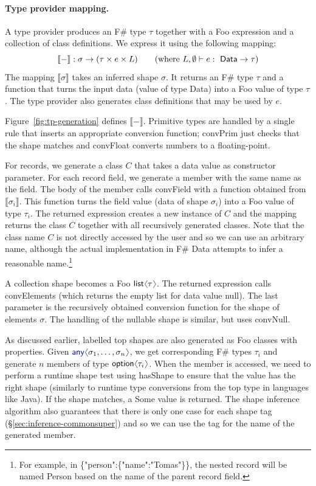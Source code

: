 \documentclass[10pt,preprint,blind,clearpagebib]{sigplanconf}
\newcommand{\langl}{\begin{picture}(4.5,7)
\put(1.1,2.5){\rotatebox{60}{\line(1,0){5.5}}}
\put(1.1,2.5){\rotatebox{300}{\line(1,0){5.5}}}
\end{picture}}
\newcommand{\rangl}{\begin{picture}(4.5,7)
\put(.9,2.5){\rotatebox{120}{\line(1,0){5.5}}}
\put(.9,2.5){\rotatebox{240}{\line(1,0){5.5}}}
\end{picture}}
\newcommand{\kvd}[1]{\textnormal{\textcolor{kvdclr}{\sffamily #1}}}
\newcommand{\str}[1]{\textnormal{\textcolor{strclr}{\sffamily "#1"}}}
\newcommand{\ident}[1]{\textnormal{\sffamily #1}}
\newcommand{\sem}[1]{\llbracket #1 \rrbracket}
\begin{document}
\paragraph{Type provider mapping.}
A type provider produces an F\# type $\tau$ together with a Foo expression and a collection of 
class definitions. We express it using the following mapping:
%
\begin{equation*}
\sem{-} : \sigma \rightarrow (\tau \times e \times L) \qquad (\textnormal{where}~L,\emptyset \vdash e:\ident{Data}\rightarrow\tau)
\end{equation*}
%
The mapping $\sem{\sigma}$ takes an inferred shape $\sigma$. It returns an F\# type $\tau$ and
a function that turns the input data (value of type \ident{Data}) into a Foo value of type $\tau$. 
The type provider also generates class definitions that may be used by $e$. 

Figure~\ref{fig:tp-generation} defines $\sem{-}$. Primitive types are handled by a single rule that
inserts an appropriate conversion function; \ident{convPrim} just checks that the shape matches
and \ident{convFloat} converts numbers to a floating-point.

For records, we generate a class $C$ that takes a data value as constructor parameter. For each 
record field, we generate a member with the same name as the field. The body of the member calls 
\ident{convField} with a function obtained from $\sem{\sigma_i}$. This function turns the field 
value (data of shape $\sigma_i$) into a Foo value of type $\tau_i$. The returned expression creates a new instance of 
$C$ and the mapping returns the class $C$ together with all recursively generated classes. Note that 
the class name $C$ is not directly accessed by the user and so we can use an arbitrary name, although the 
actual implementation in F\# Data attempts to infer a reasonable name.\footnote{For example, in 
\ident{\{\str{person}:\{\str{name}:\str{Tomas}\}\}}, the nested record will be named \ident{Person}
based on the name of the parent record field.}

A collection shape becomes a Foo $\ident{list}\langl\tau\rangl$. The returned expression calls \ident{convElements}
(which returns the empty list for data value \kvd{null}). The last parameter is the recursively obtained
conversion function for the shape of elements $\sigma$. The handling of the nullable shape is similar,
but uses \ident{convNull}.

As discussed earlier, labelled top shapes are also generated as Foo classes with properties. Given 
$\kvd{any}\langl\sigma_1, \ldots, \sigma_n\rangl$, we get corresponding F\# types $\tau_i$ and generate 
$n$ members of type $\ident{option}\langl \tau_i\rangl$. When the member is accessed, we need to perform
a runtime shape test using \ident{hasShape} to ensure that the value has the right shape (similarly to runtime 
type conversions from the top type in languages like Java). If the shape matches, a \ident{Some} value is 
returned. The shape inference algorithm also guarantees that there is only one case for each shape tag 
(\S\ref{sec:inference-commonsuper}) and so we can use the tag for the name of the generated member.
\end{document}

